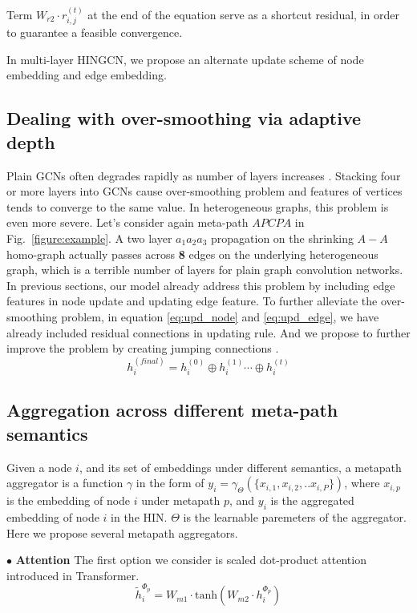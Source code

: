 Term $W_{r2}\cdot r^{(t)}_{i,j}$ at the end of the equation serve as a shortcut residual, in order to guarantee a feasible convergence.

In multi-layer HINGCN, we propose an alternate update scheme of node embedding and edge embedding. 
\subsection{Dealing with over-smoothing via adaptive depth}
Plain GCNs often degrades rapidly as number of layers increases \cite{LiHW18,abs-1904-03751}. Stacking four or more layers into GCNs cause over-smoothing problem and features of vertices tends to converge to the same value. In heterogeneous graphs, this problem is even more severe. Let's consider again meta-path $APCPA$ in Fig.~\ref{figure:example}. A two layer $a_1 a_2 a_3$ propagation on the shrinking $A-A$ homo-graph actually passes across \textbf{8} edges on the underlying heterogeneous graph, which is a terrible number of layers for plain graph convolution networks.
In previous sections, our model already address this problem by including edge features in node update and updating edge feature. To further alleviate the over-smoothing problem, in equation \ref{eq:upd_node} and \ref{eq:upd_edge}, we have already included residual connections \cite{HeZRS16} in updating rule. And we propose to further improve the problem by creating jumping connections \cite{XuLTSKJ18}.
\begin{equation}
\label{eq:jump}
h^{(final)}_i = h^{(0)}_i \oplus h^{(1)}_i \cdots \oplus h^{(t)}_i
\end{equation} 

\subsection{Aggregation across different meta-path semantics}
\label{sec:mp_aggr}
Given a node $i$, and its set of embeddings under different semantics, a metapath aggregator is a function $\gamma$ in the form of $y_i = \gamma_\Theta(\{x_{i,1},x_{i,2},..x_{i,P}\})$, where $x_{i,p}$ is the embedding of node $i$ under metapath $p$, and $y_i$ is the aggregated embedding of node $i$ in the HIN. $\Theta$ is the learnable paremeters of the aggregator.
Here we propose several metapath aggregators. 

$\bullet$ \textbf{Attention}
 The first option we consider is scaled dot-product attention introduced in Transformer. 
\begin{equation}
\label{eq:mp_mlp}
\tilde{h}^{\Phi_p}_i = W_{m1} \cdot \text{tanh}(W_{m2} \cdot h^{\Phi_p}_i)
\end{equation}

